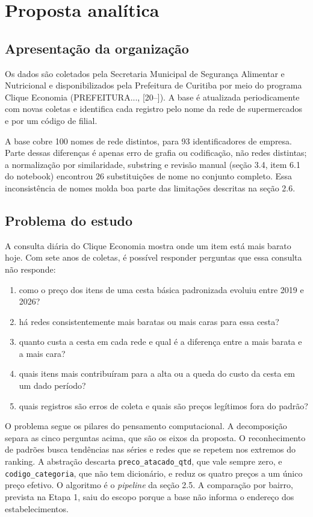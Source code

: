 \documentclass[11pt,a4paper]{article}
\newcommand{\col}[1]{\texttt{#1}}
\begin{document}
\section{Proposta analítica}

\subsection{Apresentação da organização}

Os dados são coletados pela Secretaria Municipal de Segurança Alimentar e Nutricional e disponibilizados pela Prefeitura de Curitiba por meio do programa Clique Economia (PREFEITURA..., [20--]). A base é atualizada periodicamente com novas coletas e identifica cada registro pelo nome da rede de supermercados e por um código de filial.

A base cobre 100 nomes de rede distintos, para 93 identificadores de empresa. Parte dessas diferenças é apenas erro de grafia ou codificação, não redes distintas; a normalização por similaridade, substring e revisão manual (seção 3.4, item 6.1 do notebook) encontrou 26 substituições de nome no conjunto completo. Essa inconsistência de nomes molda boa parte das limitações descritas na seção 2.6.

\subsection{Problema do estudo}

A consulta diária do Clique Economia mostra onde um item está mais barato hoje. Com sete anos de coletas, é possível responder perguntas que essa consulta não responde:

\begin{enumerate}[label=\alph*), itemsep=0pt, topsep=2pt]
  \item como o preço dos itens de uma cesta básica padronizada evoluiu entre 2019 e 2026?
  \item há redes consistentemente mais baratas ou mais caras para essa cesta?
  \item quanto custa a cesta em cada rede e qual é a diferença entre a mais barata e a mais cara?
  \item quais itens mais contribuíram para a alta ou a queda do custo da cesta em um dado período?
  \item quais registros são erros de coleta e quais são preços legítimos fora do padrão?
\end{enumerate}

O problema segue os pilares do pensamento computacional. A decomposição separa as cinco perguntas acima, que são os eixos da proposta. O reconhecimento de padrões busca tendências nas séries e redes que se repetem nos extremos do ranking. A abstração descarta \col{preco\_atacado\_qtd}, que vale sempre zero, e \col{codigo\_categoria}, que não tem dicionário, e reduz os quatro preços a um único preço efetivo. O algoritmo é o \textit{pipeline} da seção 2.5. A comparação por bairro, prevista na Etapa 1, saiu do escopo porque a base não informa o endereço dos estabelecimentos.
\end{document}
